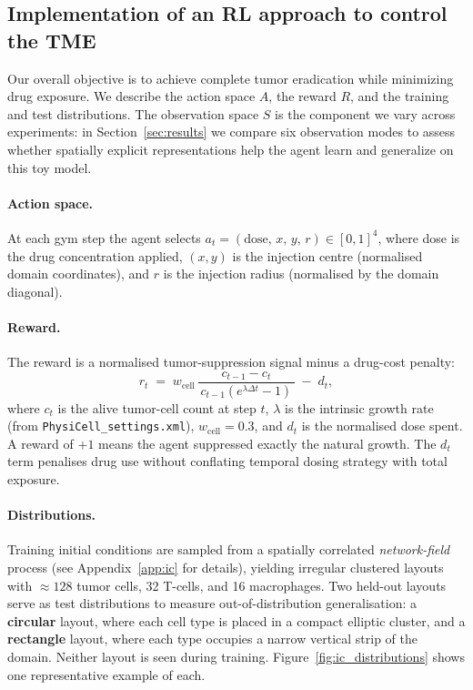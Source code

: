 \documentclass{article}
\begin{document}
\subsection{Implementation of an RL approach to control the TME}
\label{sec:rl}

Our overall objective is to achieve complete tumor eradication while minimizing
drug exposure. We describe the action space $A$, the reward $R$, and the
training and test distributions. The observation space $S$ is the component we
vary across experiments: in Section~\ref{sec:results} we compare six
observation modes to assess whether spatially explicit representations help
the agent learn and generalize on this toy model.

\paragraph{Action space.}
At each gym step the agent selects
$a_t = (\text{dose},\,x,\,y,\,r)\in[0,1]^4$,
where dose is the drug concentration applied, $(x,y)$ is the injection centre
(normalised domain coordinates), and $r$ is the injection radius (normalised
by the domain diagonal).

\paragraph{Reward.}
The reward is a normalised tumor-suppression signal minus a drug-cost penalty:
\begin{equation}
  r_t \;=\; w_{\text{cell}}\,
  \frac{c_{t-1} - c_t}{\,c_{t-1}(e^{\lambda\Delta t}-1)\,}
  \;-\; d_t,
  \label{eq:reward}
\end{equation}
where $c_t$ is the alive tumor-cell count at step $t$,
$\lambda$ is the intrinsic growth rate (from \texttt{PhysiCell\_settings.xml}),
$w_{\text{cell}}=0.3$, and $d_t$ is the normalised dose spent.
A reward of $+1$ means the agent suppressed exactly the natural growth.
The $d_t$ term penalises drug use without conflating temporal dosing
strategy with total exposure.

\paragraph{Distributions.}
\label{sec:distributions}
Training initial conditions are sampled from a spatially correlated
\emph{network-field} process (see Appendix~\ref{app:ic} for details),
yielding irregular clustered layouts with $\approx128$ tumor cells,
32 T-cells, and 16 macrophages.
Two held-out layouts serve as test distributions to measure
out-of-distribution generalisation: a \textbf{circular} layout, where
each cell type is placed in a compact elliptic cluster, and a
\textbf{rectangle} layout, where each type occupies a narrow vertical
strip of the domain.
Neither layout is seen during training.
Figure~\ref{fig:ic_distributions} shows one representative example of each.
\end{document}
